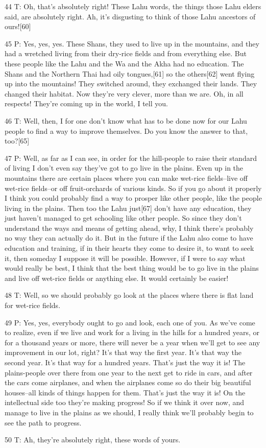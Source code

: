 {44 T: Oh, that's absolutely right! These Lahu words, the things those Lahu
elders said, are absolutely right. Ah, it's disgusting to think of those Lahu ancestors
of ours![60]}

{45 P: Yes, yes, yes. These Shans, they used to live up in the mountains,
and they had a wretched living from their dry-rice fields and from everything else.
But these people like the Lahu and the Wa and the Akha had no education. The Shans
and the Northern Thai had oily tongues,[61] so the others[62] went flying up into
the mountains! They switched around, they exchanged their lands. They changed their
habitat. Now they're very clever, more than we are. Oh, in all respects! They're
coming up in the world, I tell you.}

{46 T: Well, then, I for one don't know what has to be done now for our
Lahu people to find a way to improve themselves. Do you know the answer to that,
too?[65]}

{47 P: Well, as far as I can see, in order for the hill-people to raise
their standard of living I don't even say they've got to go live in the plains.
Even up in the mountains there are certain places where you can make wet-rice fields--live
off wet-rice fields--or off fruit-orchards of various kinds. So if you go about
it properly I think you could probably find a way to prosper like other people,
like the people living in the plains. Then too the Lahu just[67] don't have any
education, they just haven't managed to get schooling like other people. So since
they don't understand the ways and means of getting ahead, why, I think there's
probably no way they can actually do it. But in the future if the Lahu also come
to have education and training, if in their hearts they come to desire it, to want
to seek it, then someday I suppose it will be possible. However, if I were to say
what would really be best, I think that the best thing would be to go live in the
plains and live off wet-rice fields or anything else. It would certainly be easier!
}

{48 T: Well, so we should probably go look at the places where there is
flat land for wet-rice fields. }

{49 P: Yes, yes, everybody ought to go and look, each one of you. As we've
come to realize, even if we live and work for a living in the hills for a hundred
years, or for a thousand years or more, there will never be a year when we'll get
to see any improvement in our lot, right? It's that way the first year. It's that
way the second year. It's that way for a hundred years. That's just the way it
is! The plains-people over there from one year to the next get to ride in cars,
and after the cars come airplanes, and when the airplanes come so do their big
beautiful houses--all kinds of things happen for them. That's just the way it is!
On the intellectual side too they're making progress! So if we think it over now,
and manage to live in the plains as we should, I really think we'll probably begin
to see the path to progress. }

{50 T: Ah, they're absolutely right, these words of yours. }


